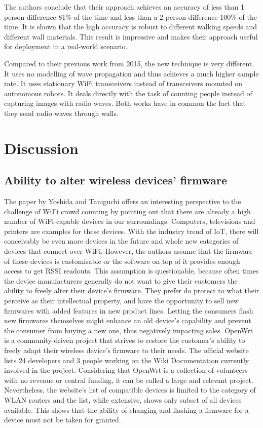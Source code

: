 \documentclass[conference]{IEEEtran}
\begin{document}
\par
The authors conclude that their approach achieves an accuracy of less than 1 person difference 81\% of the time and less than a 2 person difference 100\% of the time. It is shown that the high accuracy is robust to different walking speeds and different wall materials. This result is impressive and makes their approach useful for deployment in a real-world scenario.
\par
Compared to their previous work from 2015, the new technique is very different. It uses no modelling of wave propagation and thus achieves a much higher sample rate. It uses stationary WiFi transceivers instead of transceivers mounted on autonomous robots. It deals directly with the task of counting people instead of capturing images with radio waves. Both works have in common the fact that they send radio waves through walls.
\section{Discussion}
\subsection{Ability to alter wireless devices' firmware}
The paper by Yoshida and Taniguchi \cite{Yoshida} offers an interesting perspective to the challenge of WiFi crowd counting by pointing out that there are already a high number of WiFi-capable devices in our surroundings. Computers, televisions and printers are examples for these devices. With the industry trend of IoT, there will conceivably be even more devices in the future and whole new categories of devices that connect over WiFi. However, the authors assume that the firmware of these devices is customisable or the software on top of it provides enough access to get RSSI readouts. This assumption is questionable, because often times the device manufacturers generally do not want to give their customers the ability to freely alter their device's firmware. They prefer do protect to what their perceive as their intellectual property, and have the opportunity to sell new firmwares with added features in new product lines. Letting the consumers flash new firmwares themselves might enhance an old device's capability and prevent the consumer from buying a new one, thus negatively impacting sales. OpenWrt \cite{OpenWrt} is a community-driven project that strives to restore the customer's ability to freely adapt their wireless device's firmware to their needs. The official website lists 24 developers and 3 people working on the Wiki Documentation currently involved in the project. Considering that OpenWrt is a collection of volunteers with no revenue or central funding, it can be called a large and relevant project. Nevertheless, the website's list of compatible devices is limited to the category of WLAN routers and the list, while extensive, shows only subset of all devices available. This shows that the ability of changing and flashing a firmware for a device must not be taken for granted.
\end{document}
